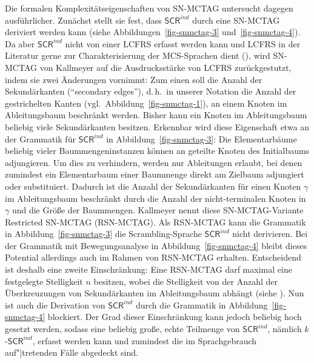 Die formalen Komplexitätseigenschaften von SN-MCTAG untersucht \cite{Kallmeyer:05} dagegen ausführlicher. Zunächst stellt sie fest, dass $\mathsf{SCR}^{ind}$ durch eine SN-MCTAG deriviert werden kann (siehe Abbildungen~\ref{fig-snmctag-3} und~\ref{fig-snmctag-4}). Da aber $\mathsf{SCR}^{ind}$ nicht von einer LCFRS erfasst werden kann \citep{Becker:Rambow:Niv:92} und LCFRS in der Literatur gerne zur Charakterisierung der MCS-Sprachen dient (\citealt{Kallmeyer:10b}), wird SN-MCTAG von Kallmeyer auf die Ausdrucksstärke von LCFRS zurückgestutzt, indem sie zwei Änderungen vornimmt: Zum einen soll die Anzahl der Sekundärkanten ("`secondary edges"'), d.\,h.\ in unserer Notation die Anzahl der gestrichelten Kanten (vgl.\ Abbildung~\ref{fig-snmctag-1}), an einem Knoten im Ableitungsbaum beschränkt werden. Bisher kann ein Knoten im Ableitungsbaum beliebig viele Sekundärkanten besitzen. Erkennbar wird diese Eigenschaft etwa an der Grammatik für $\mathsf{SCR}^{ind}$ in Abbildung~\ref{fig-snmctag-3}: Die Elementarbäume beliebig vieler Baummengeninstanzen können an geteilte Knoten des Initialbaums adjungieren. Um dies zu verhindern, werden nur Ableitungen erlaubt, bei denen zumindest ein Elementarbaum einer Baummenge direkt am Zielbaum adjungiert oder substituiert. Dadurch ist die Anzahl der Sekundärkanten für einen Knoten $\gamma$ im Ableitungsbaum beschränkt durch die Anzahl der nicht-terminalen Knoten in $\gamma$ und die Grö\ss e der Baummengen. Kallmeyer nennt diese SN-MCTAG-Variante Restricted SN-MCTAG (RSN-MCTAG). Als RSN-MCTAG  kann die Grammatik in Abbildung~\ref{fig-snmctag-3} die Scrambling-Sprache $\mathsf{SCR}^{ind}$ nicht derivieren. Bei der Grammatik mit Bewegungsanalyse in Abbildung~\ref{fig-snmctag-4} bleibt dieses Potential allerdings auch im Rahmen von RSN-MCTAG erhalten. Entscheidend ist deshalb eine zweite Einschränkung: Eine RSN-MCTAG darf maximal eine festgelegte Stelligkeit $n$ besitzen, wobei die Stelligkeit von der Anzahl der Überkreuzungen von Sekundärkanten im Ableitungsbaum abhängt (siehe \citealt[212f]{Kallmeyer:05}). Nun ist auch die Derivation von $\mathsf{SCR}^{ind}$ durch die Grammatik in Abbildung~\ref{fig-snmctag-4} blockiert. Der Grad dieser Einschränkung kann jedoch beliebig hoch gesetzt werden, sodass eine beliebig gro\ss e, echte Teilmenge von $\mathsf{SCR}^{ind}$, nämlich $k$-$\mathsf{SCR}^{ind}$, erfasst werden kann und zumindest die im Sprachgebrauch auf"|tretenden Fälle abgedeckt sind.\\

